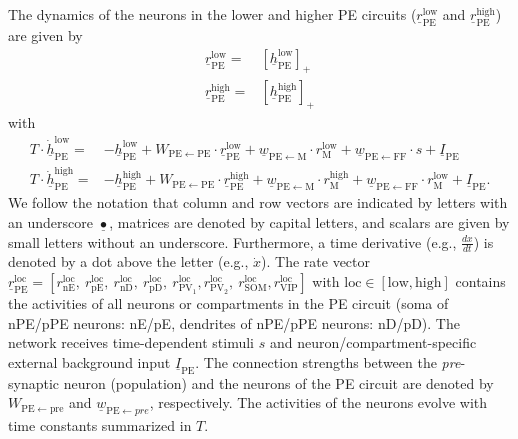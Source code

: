 \documentclass[10pt,a4paper,draft]{article}
\begin{document}
The dynamics of the neurons in the lower and higher PE circuits ($\underline{r}_\mathrm{PE}^\mathrm{low}$ and $\underline{r}_\mathrm{PE}^\mathrm{high}$) are given by
%
\begin{align}
\underline{r}_\mathrm{PE}^\mathrm{low} = & \left[ \underline{h}_\mathrm{PE}^\mathrm{low} \right]_+ \nonumber\\
%
\underline{r}_\mathrm{PE}^\mathrm{high} = & \left[ \underline{h}_\mathrm{PE}^\mathrm{high} \right]_+ 
\end{align}
%
with
%
\begin{align}
T \cdot \underline{\dot{h}}_\mathrm{PE}^\mathrm{low} =& -\underline{h}_\mathrm{PE}^\mathrm{low} + W_\mathrm{PE\leftarrow PE} \cdot \underline{r}_\mathrm{PE}^\mathrm{low} + \underline{w}_\mathrm{PE\leftarrow M} \cdot r_\mathrm{M}^\mathrm{low} + \underline{w}_\mathrm{PE\leftarrow FF} \cdot s + \underline{I}_\mathrm{PE} \nonumber\\
%
T \cdot \underline{\dot{h}}_\mathrm{PE}^\mathrm{high} =& -\underline{h}_\mathrm{PE}^\mathrm{high} + W_\mathrm{PE\leftarrow PE} \cdot \underline{r}_\mathrm{PE}^\mathrm{high} + \underline{w}_\mathrm{PE\leftarrow M} \cdot r_\mathrm{M}^\mathrm{high} + \underline{w}_\mathrm{PE\leftarrow FF} \cdot r_\mathrm{M}^\mathrm{low} + \underline{I}_\mathrm{PE}.
%
\end{align}
%
We follow the notation that column and row vectors are indicated by letters with an underscore $\underline{\bullet}$, matrices are denoted by capital letters, and scalars are given by small letters without an underscore. Furthermore, a time derivative (e.g., $\frac{dx}{dt}$) is denoted by a dot above the letter (e.g., $\dot{x}$). The rate vector $\underline{r}_\mathrm{PE}^\mathrm{loc} = \left[r_\mathrm{nE}^\mathrm{loc},\ r_\mathrm{pE}^\mathrm{loc},\ r_\mathrm{nD}^\mathrm{loc},\ r_\mathrm{pD}^\mathrm{loc},\ r_\mathrm{PV_1}^\mathrm{loc}, r_\mathrm{PV_2}^\mathrm{loc},\ r_\mathrm{SOM}^\mathrm{loc}, r_\mathrm{VIP}^\mathrm{loc} \right]$  with $\mathrm{loc} \in [\mathrm{low}, \mathrm{high}]$ contains the activities of all neurons or compartments in the PE circuit (soma of nPE/pPE neurons: nE/pE, dendrites of nPE/pPE neurons: nD/pD). The network receives time-dependent stimuli $s$ and neuron/compartment-specific external background input $\underline{I}_\mathrm{PE}$. The connection strengths between the \textit{pre}-synaptic neuron (population) and the neurons of the PE circuit are denoted by $W_\mathrm{PE\leftarrow pre}$ and $\underline{w}_{\mathrm{PE} \leftarrow pre}$, respectively. The activities of the neurons evolve with time constants summarized in $T$.
\end{document}
